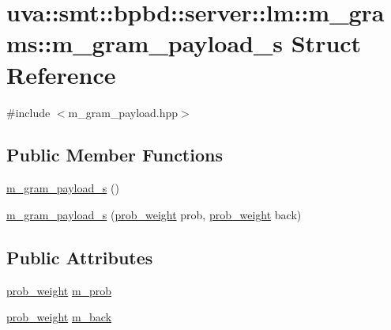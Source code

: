 \hypertarget{structuva_1_1smt_1_1bpbd_1_1server_1_1lm_1_1m__grams_1_1m__gram__payload__s}{}\section{uva\+:\+:smt\+:\+:bpbd\+:\+:server\+:\+:lm\+:\+:m\+\_\+grams\+:\+:m\+\_\+gram\+\_\+payload\+\_\+s Struct Reference}
\label{structuva_1_1smt_1_1bpbd_1_1server_1_1lm_1_1m__grams_1_1m__gram__payload__s}


{\ttfamily \#include $<$m\+\_\+gram\+\_\+payload.\+hpp$>$}

\subsection*{Public Member Functions}
\begin{DoxyCompactItemize}
\item 
\hyperlink{structuva_1_1smt_1_1bpbd_1_1server_1_1lm_1_1m__grams_1_1m__gram__payload__s_a9dc30f9e543c982b3e3f358aab0fe3a4}{m\+\_\+gram\+\_\+payload\+\_\+s} ()
\item 
\hyperlink{structuva_1_1smt_1_1bpbd_1_1server_1_1lm_1_1m__grams_1_1m__gram__payload__s_a11aa6347f9becd32b99aae0768227a03}{m\+\_\+gram\+\_\+payload\+\_\+s} (\hyperlink{namespaceuva_1_1smt_1_1bpbd_1_1server_a01e9ea4de9c226f4464862e84ff0bbcc}{prob\+\_\+weight} prob, \hyperlink{namespaceuva_1_1smt_1_1bpbd_1_1server_a01e9ea4de9c226f4464862e84ff0bbcc}{prob\+\_\+weight} back)
\end{DoxyCompactItemize}
\subsection*{Public Attributes}
\begin{DoxyCompactItemize}
\item 
\hyperlink{namespaceuva_1_1smt_1_1bpbd_1_1server_a01e9ea4de9c226f4464862e84ff0bbcc}{prob\+\_\+weight} \hyperlink{structuva_1_1smt_1_1bpbd_1_1server_1_1lm_1_1m__grams_1_1m__gram__payload__s_ac9f21db3ce3b299ec639d137fb072c52}{m\+\_\+prob}
\item 
\hyperlink{namespaceuva_1_1smt_1_1bpbd_1_1server_a01e9ea4de9c226f4464862e84ff0bbcc}{prob\+\_\+weight} \hyperlink{structuva_1_1smt_1_1bpbd_1_1server_1_1lm_1_1m__grams_1_1m__gram__payload__s_af5e27ce8f5246ec30a01979b5ac2271c}{m\+\_\+back}
\end{DoxyCompactItemize}


